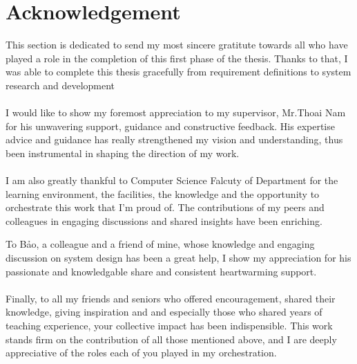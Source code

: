 \section*{Acknowledgement}
\thispagestyle{empty}
This section is dedicated to send my most sincere gratitute towards all who have played a role in the completion of this first phase of the thesis. Thanks to that, I was able to complete this thesis gracefully from requirement definitions to system research and development
\\\\
I would like to show my foremost appreciation to my supervisor, Mr.Thoai Nam for his unwavering support, guidance and constructive feedback. His expertise advice and guidance has really strengthened my vision and understanding, thus been instrumental in shaping the direction of my work.
\\\\
I am also greatly thankful to Computer Science Falcuty of Department for the learning environment, the facilities, the knowledge and the opportunity to orchestrate this work that I'm proud of. The contributions of my peers and colleagues in engaging discussions and shared insights have been enriching. 

To Bảo, a colleague and a friend of mine, whose knowledge and engaging discussion on system design has been a great help, I show my appreciation for his passionate and knowledgable share and consistent heart\-warming support.
\\\\
Finally, to all my friends and seniors who offered encouragement, shared their knowledge, giving inspiration and and especially those who shared years of teaching experience, your collective impact has been indispensible. This work stands firm on the contribution of all those mentioned above, and I are deeply appreciative of the roles each of you played in my orchestration.
\clearpage
{}

